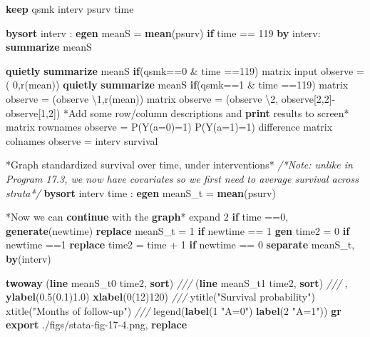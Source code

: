 \documentclass[
  10pt,
]{book}
\newenvironment{Shaded}{\begin{snugshade}}{\end{snugshade}}
\newcommand{\BaseNTok}[1]{\textcolor[rgb]{0.00,0.00,0.81}{#1}}
\newcommand{\CommentTok}[1]{\textcolor[rgb]{0.56,0.35,0.01}{\textit{#1}}}
\newcommand{\FunctionTok}[1]{\textcolor[rgb]{0.00,0.00,0.00}{#1}}
\newcommand{\KeywordTok}[1]{\textcolor[rgb]{0.13,0.29,0.53}{\textbf{#1}}}
\newcommand{\NormalTok}[1]{#1}
\newcommand{\OtherTok}[1]{\textcolor[rgb]{0.56,0.35,0.01}{#1}}
\newcommand{\StringTok}[1]{\textcolor[rgb]{0.31,0.60,0.02}{#1}}
\begin{document}
\begin{Shaded}
\begin{Highlighting}[]
\KeywordTok{keep}\NormalTok{ qsmk interv psurv time   }
        
\KeywordTok{bysort}\NormalTok{ interv : }\KeywordTok{egen}\NormalTok{ meanS = }\KeywordTok{mean}\NormalTok{(psurv) }\KeywordTok{if}\NormalTok{ time == 119}
\KeywordTok{by}\NormalTok{ interv: }\KeywordTok{summarize}\NormalTok{ meanS}

\KeywordTok{quietly} \KeywordTok{summarize}\NormalTok{ meanS }\KeywordTok{if}\NormalTok{(qsmk==0  \& time ==119)}
\FunctionTok{matrix}\NormalTok{ input observe = ( 0,}\OtherTok{\textasciigrave{}r(mean)\textquotesingle{}}\NormalTok{)}
\KeywordTok{quietly} \KeywordTok{summarize}\NormalTok{ meanS }\KeywordTok{if}\NormalTok{(qsmk==1  \& time ==119)}
\FunctionTok{matrix}\NormalTok{ observe = (observe \textbackslash{}1,}\OtherTok{\textasciigrave{}r(mean)\textquotesingle{}}\NormalTok{)}
\FunctionTok{matrix}\NormalTok{ observe = (observe \textbackslash{}2, observe[2,2]{-}observe[1,2]) }
\NormalTok{*Add some }\OtherTok{row}\NormalTok{/column descriptions and }\KeywordTok{print}\NormalTok{ results to screen*}
\FunctionTok{matrix} \OtherTok{rownames}\NormalTok{ observe =  P(Y(a=0)=1) P(Y(a=1)=1) difference}
\FunctionTok{matrix} \OtherTok{colnames}\NormalTok{ observe = interv survival}

\NormalTok{*Graph standardized survival }\BaseNTok{over}\NormalTok{ time, under interventions*}
\CommentTok{/*Note: unlike in Program 17.3, we now have covariates }
\CommentTok{so we first need to average survival across strata*/}
\KeywordTok{bysort}\NormalTok{ interv time : }\KeywordTok{egen}\NormalTok{ meanS\_t = }\KeywordTok{mean}\NormalTok{(psurv)}

\NormalTok{*Now we can }\KeywordTok{continue}\NormalTok{ with the }\KeywordTok{graph}\NormalTok{*}
\NormalTok{expand 2 }\KeywordTok{if}\NormalTok{ time ==0, }\KeywordTok{generate}\NormalTok{(newtime)}
\KeywordTok{replace}\NormalTok{ meanS\_t  = 1 }\KeywordTok{if}\NormalTok{ newtime == 1}
\KeywordTok{gen}\NormalTok{ time2 = 0 }\KeywordTok{if}\NormalTok{ newtime ==1}
\KeywordTok{replace}\NormalTok{ time2 = time + 1 }\KeywordTok{if}\NormalTok{ newtime == 0}
\KeywordTok{separate}\NormalTok{ meanS\_t, }\KeywordTok{by}\NormalTok{(interv) }

\KeywordTok{twoway}\NormalTok{ (}\KeywordTok{line}\NormalTok{ meanS\_t0 time2, }\KeywordTok{sort}\NormalTok{) }\CommentTok{///}
\NormalTok{  (}\KeywordTok{line}\NormalTok{ meanS\_t1 time2, }\KeywordTok{sort}\NormalTok{) }\CommentTok{///}
\NormalTok{  , }\KeywordTok{ylabel}\NormalTok{(0.5(0.1)1.0) }\KeywordTok{xlabel}\NormalTok{(0(12)120) }\CommentTok{///}
  \BaseNTok{ytitle}\NormalTok{(}\StringTok{"Survival probability"}\NormalTok{) }\BaseNTok{xtitle}\NormalTok{(}\StringTok{"Months of follow{-}up"}\NormalTok{) }\CommentTok{///}
  \BaseNTok{legend}\NormalTok{(}\KeywordTok{label}\NormalTok{(1 }\StringTok{"A=0"}\NormalTok{) }\KeywordTok{label}\NormalTok{(2 }\StringTok{"A=1"}\NormalTok{))}
\KeywordTok{gr} \KeywordTok{export}\NormalTok{ ./figs/stata{-}fig{-}17{-}4.png, }\KeywordTok{replace}


\end{Highlighting}
\end{Shaded}
\end{document}
